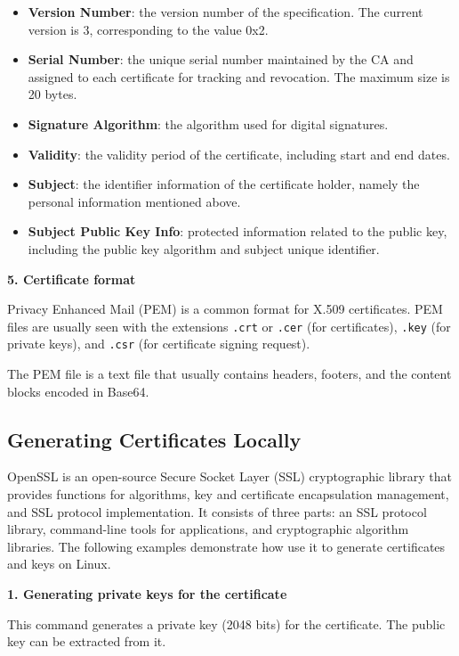\documentclass[a4paper,12pt,openany]{book}
\begin{document}
\begin{itemize}[leftmargin=1.5em,noitemsep]
    \item \textbf{Version Number}: the version number of the specification. The current version is 3, corresponding to the value 0x2.
    \item \textbf{Serial Number}: the unique serial number maintained by the CA and assigned to each certificate for tracking and revocation. The maximum size is 20 bytes.
    \item \textbf{Signature Algorithm}: the algorithm used for digital signatures.
    \item \textbf{Validity}: the validity period of the certificate, including start and end dates.
    \item \textbf{Subject}: the identifier information of the certificate holder, namely the personal information mentioned above.
    \item \textbf{Subject Public Key Info}: protected information related to the public key, including the public key algorithm and subject unique identifier.
\end{itemize}

\textbf{5.	Certificate format}

Privacy Enhanced Mail (PEM) is a common format for X.509 certificates. PEM files are usually seen with the extensions \verb|.crt| or \verb|.cer| (for certificates), \verb|.key| (for private keys), and \verb|.csr| (for certificate signing request).

The PEM file is a text file that usually contains headers, footers, and the content blocks encoded in Base64.

\subsection{Generating Certificates Locally}
OpenSSL is an open-source Secure Socket Layer (SSL) cryptographic library that provides functions for algorithms, key and certificate encapsulation management, and SSL protocol implementation. It consists of three parts: an SSL protocol library, command-line tools for applications, and cryptographic algorithm libraries. The following examples demonstrate how use it to generate certificates and keys on Linux.

\textbf{1.	Generating private keys for the certificate}

This command generates a private key (2048 bits) for the certificate. The public key can be extracted from it.
\end{document}
